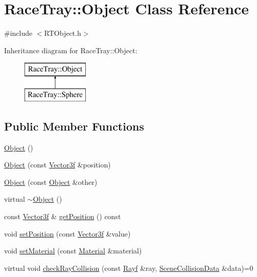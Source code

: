 \hypertarget{class_race_tray_1_1_object}{\section{Race\-Tray\-:\-:Object Class Reference}
\label{class_race_tray_1_1_object}
}


{\ttfamily \#include $<$R\-T\-Object.\-h$>$}

Inheritance diagram for Race\-Tray\-:\-:Object\-:\begin{figure}[H]
\begin{center}
\leavevmode
\includegraphics[height=2.000000cm]{class_race_tray_1_1_object}
\end{center}
\end{figure}
\subsection*{Public Member Functions}
\begin{DoxyCompactItemize}
\item 
\hyperlink{class_race_tray_1_1_object_a3d14b748925951286cdc9f7b7d89f7fc}{Object} ()
\item 
\hyperlink{class_race_tray_1_1_object_a71b2eda3dc35db9c3719d8e5d203cb8e}{Object} (const \hyperlink{group___math_gadb6fa781064c3c3c9b13eb984adae162}{Vector3f} \&position)
\item 
\hyperlink{class_race_tray_1_1_object_ad9dd5ecc6017aa2f2054c145ff7830b1}{Object} (const \hyperlink{class_race_tray_1_1_object}{Object} \&other)
\item 
virtual \hyperlink{class_race_tray_1_1_object_aa1d05ba307a8bbeb1c8e01427d6daa58}{$\sim$\-Object} ()
\item 
const \hyperlink{group___math_gadb6fa781064c3c3c9b13eb984adae162}{Vector3f} \& \hyperlink{class_race_tray_1_1_object_a0b5489af58a3195079940162ed7307fe}{get\-Position} () const 
\item 
void \hyperlink{class_race_tray_1_1_object_a2401b3f2bcaaf2fc9f55b3b677d30b77}{set\-Position} (const \hyperlink{group___math_gadb6fa781064c3c3c9b13eb984adae162}{Vector3f} \&value)
\item 
void \hyperlink{class_race_tray_1_1_object_af5b702a62a9d6fd27f0c012df0f2e795}{set\-Material} (const \hyperlink{class_race_tray_1_1_material}{Material} \&material)
\item 
virtual void \hyperlink{class_race_tray_1_1_object_a6ea71904be1d47e93378e58848b6eb87}{check\-Ray\-Collision} (const \hyperlink{group___math_ga5fdea6c2a8db84c0cc5b7aaeeb48b17a}{Rayf} \&ray, \hyperlink{class_race_tray_1_1_scene_collision_data}{Scene\-Collision\-Data} \&data)=0
\end{DoxyCompactItemize}
